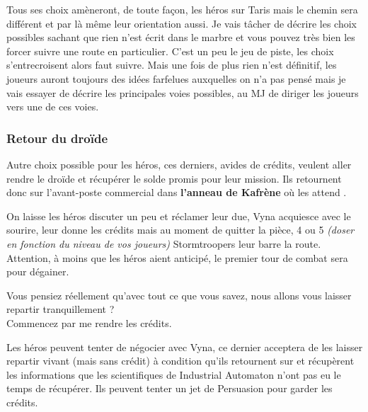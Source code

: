 Tous ses choix amèneront, de toute façon, les héros sur Taris mais le chemin sera différent et par là même leur orientation aussi. Je vais tâcher de décrire les choix possibles sachant que rien n’est écrit dans le marbre et vous pouvez très bien les forcer suivre une route en particulier. C’est un peu le jeu de piste, les choix s’entrecroisent alors faut suivre. Mais une fois de plus rien n’est définitif, les joueurs auront toujours des idées farfelues auxquelles on n’a pas pensé mais je vais essayer de décrire les principales voies possibles, au MJ de diriger les joueurs vers une de ces voies.


\subsubsection{Retour du droïde} \label{sec:retour-du-droide}

Autre choix possible pour les héros, ces derniers, avides de crédits, veulent aller rendre le droïde et récupérer le solde promis pour leur mission. Ils retournent donc sur l’avant-poste commercial dans \textbf{l’anneau de Kafrène} où les attend .

On laisse les héros discuter un peu et réclamer leur due, Vyna acquiesce avec le sourire, leur donne les crédits mais au moment de quitter la pièce, 4 ou 5 \textit{(doser en fonction du niveau de vos joueurs)} Stormtroopers leur barre la route. Attention, à moins que les héros aient anticipé, le premier tour de combat sera pour dégainer.

\begin{quotebox}
    Vous pensiez réellement qu’avec tout ce que vous savez, nous allons vous laisser repartir tranquillement ?\\
    Commencez par me rendre les crédits.
\end{quotebox}

Les héros peuvent tenter de négocier avec Vyna, ce dernier acceptera de les laisser repartir vivant (mais sans crédit) à condition qu’ils retournent sur  et récupèrent les informations que les scientifiques de Industrial Automaton n’ont pas eu le temps de récupérer. Ils peuvent tenter un jet de Persuasion pour garder les crédits.\\

